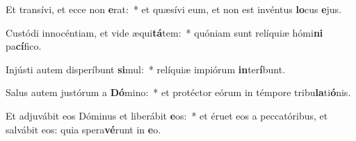 \item Et transívi, et ecce non \textbf{e}rat:~* et quæsívi eum, et non est invéntus \textbf{lo}cus \textbf{e}jus.
\item Custódi innocéntiam, et vide æqui\textbf{tá}tem:~* quóniam sunt relíquiæ hómi\textbf{ni} pa\textbf{cí}fico.
\item Injústi autem disperíbunt \textbf{si}mul:~* relíquiæ impiórum \textbf{in}ter\textbf{í}bunt.
\item Salus autem justórum a \textbf{Dó}mino:~* et protéctor eórum in témpore tribu\textbf{la}ti\textbf{ó}nis.
\item Et adjuvábit eos Dóminus et liberábit \textbf{e}os:~* et éruet eos a peccatóribus, et salvábit eos: quia spera\textbf{vé}runt in \textbf{e}o.
